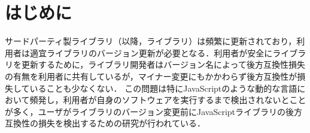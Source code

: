 \documentclass[T,J]{fose} %
\begin{document}

\section{はじめに}
サードパーティ製ライブラリ（以降，ライブラリ）は頻繁に更新されており，利用者は適宜ライブラリのバージョン更新が必要となる．利用者が安全にライブラリを更新するために，ライブラリ開発者はバージョン名によって後方互換性損失の有無を利用者に共有しているが，マイナー変更にもかかわらず後方互換性が損失していることも少なくない．
この問題は特にJavaScriptのような動的な言語において頻発し，利用者が自身のソフトウェアを実行するまで検出されないとことが多く，ユーザがライブラリのバージョン変更前にJavaScriptライブラリの後方互換性の損失を検出するための研究が行われている．
\end{document}
